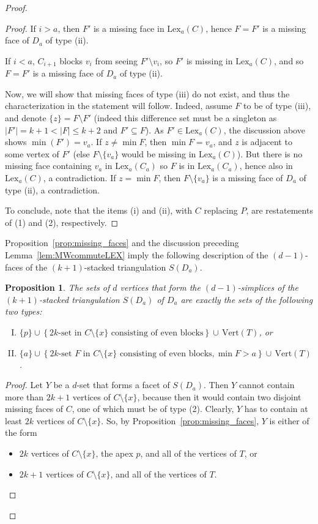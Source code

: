 \documentclass[a4paper,leqno]{article}
\newtheorem{proposition}[theorem]{Proposition}
\theoremstyle{definition}
\newcommand{\vertices}{\mathrm{Vert}}
\newcommand{\lex}{\mathrm{Lex}}
\begin{document}
\begin{proof}
\begin{proof}
If $i>a$, then $F'$ is a missing face in $\lex_a(C)$, hence $F=F'$ is a missing face of $D_a$ of type (ii).

If $i<a$, $C_{i+1}$ blocks $v_i$ from seeing $F'\setminus v_i$, so $F'$ is missing in $\lex_a(C)$, and so $F=F'$ is a missing face of $D_a$ of type (ii).

Now, we will show that missing faces of type (iii) do not exist, and thus the characterization in the statement will follow.
Indeed, assume $F$ to be of type (iii), and denote $\{z\}= F\setminus F'$ (indeed this difference set must be a singleton as $|F'|=k+1<|F|\le k+2$ and $F'\subseteq F$).
As $F'\in\lex_a(C)$, the discussion above shows $\min(F')=v_a$.
If $z\neq \min F$, then $\min F=v_a$, and $z$ is adjacent to some vertex of $F'$ (else $F\setminus\{v_a\}$ would be missing in $\lex_a(C)$).
But there is no missing face containing $v_a$ in $\lex_a(C_a)$
so $F$ is in $\lex_a(C_{a})$, hence also in $\lex_a(C)$, a contradiction.
If $z=\min F$, then $F\setminus \{v_a\}$ is a missing face of $D_a$ of type (ii), a contradiction.

To conclude, note that the items (i) and (ii), with $C$ replacing $P$, are restatements of (1) and (2), respectively.
\end{proof}

Proposition~\ref{prop:missing_faces} and the discussion preceding Lemma~\ref{lem:MWcommuteLEX} imply the following description of the $(d-1)$-faces of the $(k+1)$-stacked triangulation $S(D_a)$.

\begin{proposition}\label{prop:d-faces}
The sets of $d$ vertices that form the $(d-1)$-simplices of the $(k+1)$-stacked triangulation $S(D_a)$ of $D_a$ are exactly the sets of the following two types:
\begin{enumerate}[(I)]
	\item $\{p\}\cup \left\{2k \text{-set in } C\setminus \{x\}\text{ consisting of even blocks}\right\}\cup\, \vertices(T)$, or
	\item $\{a\}\cup \left\{2k \text{-set $F$ in } C\setminus \{x\}\text{ consisting of even blocks}, \min F>a\right\}\cup\, \vertices(T)$.
\end{enumerate}
\end{proposition}
\begin{proof}
Let $Y$ be a $d$-set that forms a facet of $S(D_a)$. Then $Y$ cannot contain more than $2k+1$ vertices of $C\setminus \{x\}$, because then it would contain two disjoint missing faces of $C$, one of which must be of type (2). Clearly, $Y$ has to contain at least $2k$ vertices of $C\setminus \{x\}$. So, by Proposition~\ref{prop:missing_faces}, $Y$ is either of the form
\begin{itemize}
	\item $2k$ vertices of $C\setminus \{x\}$, the apex $p$, and all of the vertices of $T$, or
	\item $2k+1$ vertices of $C\setminus \{x\}$, and all of the vertices of $T$.
\end{itemize}


\end{proof}
\end{proof}
\end{document}
